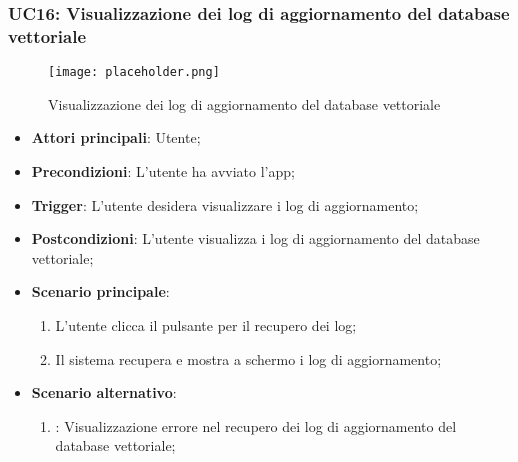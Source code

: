 \hypertarget{UC16}{}
\subsubsection{UC16: Visualizzazione dei log di aggiornamento del database vettoriale}

\begin{figure}[h]
    \centering
    \texttt{[image: placeholder.png]}
    \caption{Visualizzazione dei log di aggiornamento del database vettoriale}
\end{figure}

\begin{itemize}
    \item \textbf{Attori principali}: Utente;
    \item \textbf{Precondizioni}: L'utente ha avviato l'app;
    \item \textbf{Trigger}: L'utente desidera visualizzare i log di aggiornamento;
    \item \textbf{Postcondizioni}: L'utente visualizza i log di aggiornamento del database vettoriale;
    \item \textbf{Scenario principale}:
    \begin{enumerate}
        \item L'utente clicca il pulsante per il recupero dei log;
        \item Il sistema recupera e mostra a schermo i log di aggiornamento;
    \end{enumerate}
    \item \textbf{Scenario alternativo}:
    \begin{enumerate}
        \item {}: Visualizzazione errore nel recupero dei log di aggiornamento del database vettoriale;
    \end{enumerate}
\end{itemize}

\hypertarget{UC17}{}
